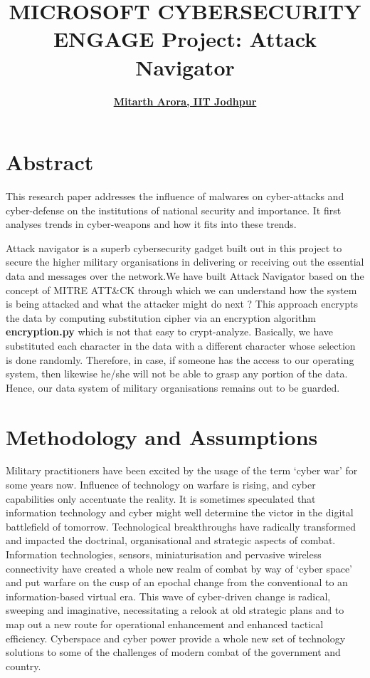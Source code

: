 \documentclass{article}
\title{MICROSOFT CYBERSECURITY ENGAGE 
Project: Attack Navigator
}
\author{\href{https://www.linkedin.com/in/mitarth-arora-27300920a/}{\bf Mitarth Arora, IIT Jodhpur} \\}
\begin{document}
\maketitle
\section{Abstract}
This research paper addresses the influence of malwares on cyber-attacks and cyber-defense on the institutions of national security and importance. It first analyses trends in cyber-weapons and how it fits into these trends.

Attack navigator is a superb cybersecurity gadget built out in this project to secure the higher military organisations in delivering or receiving out the essential data and messages over the network.We have built Attack Navigator based on the concept of MITRE ATT\&CK through which we can understand how the system is being attacked and what the attacker might do next ? This approach encrypts the data by computing substitution cipher via an encryption algorithm \textbf{encryption.py} which is not that easy to crypt-analyze. Basically, we have substituted each character in the data with a different character whose selection is done randomly. Therefore, in case, if someone has the access to our operating system, then likewise he/she will not be able to grasp any portion of the data. Hence, our data system of military organisations remains out to be guarded.


\section{Methodology and Assumptions}

Military practitioners have been excited by the usage of the term ‘cyber war’ for some years now. Influence of technology on warfare is rising, and cyber capabilities only accentuate the reality. It is sometimes speculated that information technology and cyber might well determine the victor in the digital battlefield of tomorrow. Technological breakthroughs have radically transformed and impacted the doctrinal, organisational and strategic aspects of combat. Information technologies, sensors, miniaturisation and pervasive wireless connectivity have created a whole new realm of combat by way of ‘cyber space’ and put warfare on the cusp of an epochal change from the conventional to an information-based virtual era. This wave of cyber-driven change is radical, sweeping and imaginative, necessitating a relook at old strategic plans and to map out a new route for operational enhancement and enhanced tactical efficiency. Cyberspace and cyber power provide a whole new set of technology solutions to some of the challenges of modern combat of the government and country.
\end{document}
